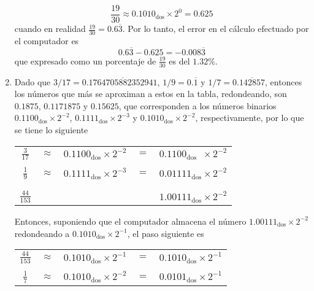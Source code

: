 \begin{solucion}
\begin{enumerate}
  \begin{equation*}
   \frac{19}{30} \approx 0.1010_{\text{dos}} \times 2^{0} = 0.625
  \end{equation*}
  cuando en realidad $\frac{19}{30} = 0.6\overline{3}$. Por lo tanto, el error en el c\'alculo efectuado por el computador es
  \begin{equation*}
   0.6\overline{3} - 0.625 = -0.008\overline{3}
  \end{equation*}
  que expresado como un porcentaje de $\frac{19}{30}$ es del $1.32\%$.

  \item Dado que $3/17 = 0.\overline{1764705882352941}$, $1/9 = 0.\overline{1}$ y $1/7 = 0.\overline{142857}$, entonces los n\'umeros que m\'as se aproximan a estos en la tabla, redondeando, son $0.1875$, $0.1171875$ y $0.15625$, que corresponden a los n\'umeros binarios $0.1100_{\text{dos}}\times 2^{-2}$, $0.1111_{\text{dos}}\times 2^{-3}$ y $0.1010_{\text{dos}}\times 2^{-2}$, respectivamente, por lo que se tiene lo siguiente
  \begin{center}
   \begin{tabular}{ccccc}
    $\frac{3}{17}$ & $\approx$ & $0.1100_{\text{dos}} \times 2^{-2}$ & $=$ & $0.1100_{\text{dos}}\phantom{1} \times 2^{-2}$ \\
    \vspace{-0.3cm} 
    \\
    $\frac{1}{9}$ & $\approx$ & $0.1111_{\text{dos}}\times 2^{-3}$ & $=$ & $0.01111_{\text{dos}} \times 2^{-2}$ \\ 
    \vspace{-0.4cm}
    \\
    \hhline{-~~~-}
    \vspace{-0.4cm}
    \\
    $\frac{44}{153}$ & & & & $1.00111_{\text{dos}} \times 2^{-2}$
   \end{tabular}
  \end{center}
  Entonces, suponiendo que el computador almacena el n\'umero $1.00111_{\text{dos}}\times 2^{-2}$ redondeando a $0.1010_{\text{dos}} \times 2^{-1}$, el paso siguiente es
  \begin{center}
   \begin{tabular}{ccccc}
    $\frac{44}{153}$ & $\approx$ & $0.1010_{\text{dos}}\times 2^{-1}$ & $=$ & $0.1010_{\text{dos}} \times 2^{-1}$ \\ 
    \vspace{-0.3cm} 
    \\
    $\frac{1}{7}$ & $\approx$ & $0.1010_{\text{dos}} \times 2^{-2}$ & $=$ & $0.0101_{\text{dos}} \times 2^{-1}$ \\

\end{tabular}
\end{center}
\end{enumerate}
\end{solucion}
